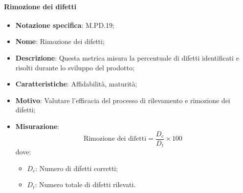 \paragraph*{Rimozione dei difetti}
\begin{itemize}
    \item \textbf{Notazione specifica}: M.PD.19;
    \item \textbf{Nome}: Rimozione dei difetti;
    \item \textbf{Descrizione}: Questa metrica misura la percentuale di difetti identificati e risolti durante lo sviluppo del prodotto;
    \item \textbf{Caratteristiche}: Affidabilità, maturità;
    \item \textbf{Motivo}: Valutare l'efficacia del processo di rilevamento e rimozione dei difetti;
    \item \textbf{Misurazione}:
    \[
        \text{Rimozione dei difetti} = \frac{D_{c}}{D_{t}} \times 100
    \]
    dove:
    \begin{itemize}
        \item $D_{c}$: Numero di difetti corretti;
        \item $D_{t}$: Numero totale di difetti rilevati.
    \end{itemize}
\end{itemize}